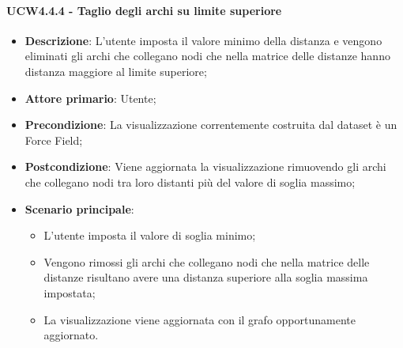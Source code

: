 \paragraph{UCW4.4.4 - Taglio degli archi su limite superiore}
\label{par:ucw4.4.4}
\begin{itemize}
    \item \textbf{Descrizione}:     L'utente imposta il valore minimo della distanza e vengono eliminati gli archi che collegano nodi che nella matrice delle distanze hanno distanza maggiore al limite superiore;
    \item \textbf{Attore primario}: Utente;
    \item \textbf{Precondizione}:   La visualizzazione correntemente costruita dal dataset è un Force Field;
    \item \textbf{Postcondizione}:  Viene aggiornata la visualizzazione rimuovendo gli archi  che collegano nodi tra loro distanti più del valore di soglia massimo;
    \item \textbf{Scenario principale}:
    \begin{itemize}
        \item L'utente imposta il valore di soglia minimo;
        \item Vengono rimossi gli archi che collegano nodi che nella matrice delle distanze risultano avere una distanza superiore alla soglia massima impostata;
        \item La visualizzazione viene aggiornata con il grafo opportunamente aggiornato.
    \end{itemize}
\end{itemize}

